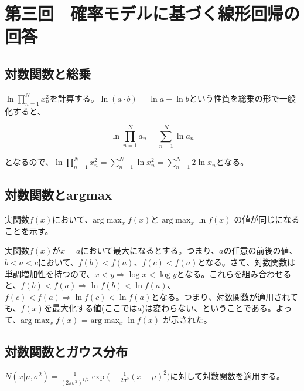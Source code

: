 \section*{第三回　確率モデルに基づく線形回帰の回答}

\subsection*{対数関数と総乗}

$\ln \prod_{n=1}^N x_n^2 $を計算する。$\ln (a \cdot b) = \ln a + \ln b$という性質を総乗の形で一般化すると、

\begin{equation*}
	\ln \prod_{n=1}^N a_n = \sum_{n=1}^N \ln a_n
\end{equation*}

となるので、$\ln \prod_{n=1}^N x_n^2 = \sum_{n=1}^N \ln x_n^2 = \sum_{n=1}^N  2\ln x_n $となる。


\subsection*{対数関数とargmax}

実関数$f(x)$において、$\mathrm{arg}\!\max_{x} f(x) $と $\mathrm{arg}\!\max_{x} \ln f(x) $ の値が同じになることを示す。

実関数$f(x)$が$x=a$において最大になるとする。つまり、$a$の任意の前後の値、$b<a<c$において、$f(b) < f(a)$、$f(c) < f(a)$となる。さて、対数関数は単調増加性を持つので、$x < y \Rightarrow \log x < \log y$となる。これらを組み合わせると、$f(b) < f(a) \Rightarrow \ln f(b) < \ln f(a)$、$f(c) < f(a) \Rightarrow \ln f(c) < \ln f(a)$となる。つまり、対数関数が適用されても、$f(x)$を最大化する値(ここでは$a$)は変わらない、ということである。よって、$\mathrm{arg}\!\max_{x} f(x) $ = $\mathrm{arg}\!\max_{x} \ln f(x) $ が示された。

\subsection*{対数関数とガウス分布}

$N(x | \mu , \sigma^2 ) = \frac{1}{(2\pi \sigma^2)^{1/2}} \exp \bigg( -\frac{1}{2\sigma^2}(x-\mu)^2 \bigg)$に対して対数関数を適用する。

